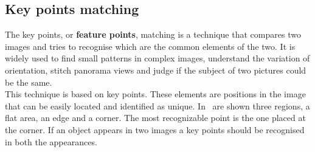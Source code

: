 \subsection{Key points matching}
The key points, or \textbf{feature points}, matching is a technique that compares two images and tries to recognise which are the common elements of the two. It is widely used to find small patterns in complex images, understand the variation of orientation, stitch panorama views and judge if the subject of two pictures could be the same.\\
This technique is based on key points. These elements are positions in the image that can be easily located and identified as unique. In~ are shown three regions, a flat area, an edge and a corner. The most recognizable point is the one placed at the corner. If an object appears in two images a key points should be recognised in both the appearances.

